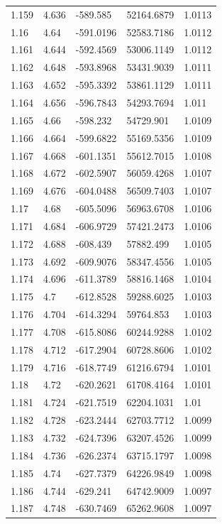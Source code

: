 \begin{tabular}{lllll}
1.159 & 4.636 & -589.585 & 52164.6879 & 1.0113 \\
1.16 & 4.64 & -591.0196 & 52583.7186 & 1.0112 \\
1.161 & 4.644 & -592.4569 & 53006.1149 & 1.0112 \\
1.162 & 4.648 & -593.8968 & 53431.9039 & 1.0111 \\
1.163 & 4.652 & -595.3392 & 53861.1129 & 1.0111 \\
1.164 & 4.656 & -596.7843 & 54293.7694 & 1.011 \\
1.165 & 4.66 & -598.232 & 54729.901 & 1.0109 \\
1.166 & 4.664 & -599.6822 & 55169.5356 & 1.0109 \\
1.167 & 4.668 & -601.1351 & 55612.7015 & 1.0108 \\
1.168 & 4.672 & -602.5907 & 56059.4268 & 1.0107 \\
1.169 & 4.676 & -604.0488 & 56509.7403 & 1.0107 \\
1.17 & 4.68 & -605.5096 & 56963.6708 & 1.0106 \\
1.171 & 4.684 & -606.9729 & 57421.2473 & 1.0106 \\
1.172 & 4.688 & -608.439 & 57882.499 & 1.0105 \\
1.173 & 4.692 & -609.9076 & 58347.4556 & 1.0105 \\
1.174 & 4.696 & -611.3789 & 58816.1468 & 1.0104 \\
1.175 & 4.7 & -612.8528 & 59288.6025 & 1.0103 \\
1.176 & 4.704 & -614.3294 & 59764.853 & 1.0103 \\
1.177 & 4.708 & -615.8086 & 60244.9288 & 1.0102 \\
1.178 & 4.712 & -617.2904 & 60728.8606 & 1.0102 \\
1.179 & 4.716 & -618.7749 & 61216.6794 & 1.0101 \\
1.18 & 4.72 & -620.2621 & 61708.4164 & 1.0101 \\
1.181 & 4.724 & -621.7519 & 62204.1031 & 1.01 \\
1.182 & 4.728 & -623.2444 & 62703.7712 & 1.0099 \\
1.183 & 4.732 & -624.7396 & 63207.4526 & 1.0099 \\
1.184 & 4.736 & -626.2374 & 63715.1797 & 1.0098 \\
1.185 & 4.74 & -627.7379 & 64226.9849 & 1.0098 \\
1.186 & 4.744 & -629.241 & 64742.9009 & 1.0097 \\
1.187 & 4.748 & -630.7469 & 65262.9608 & 1.0097 \\

\end{tabular}
